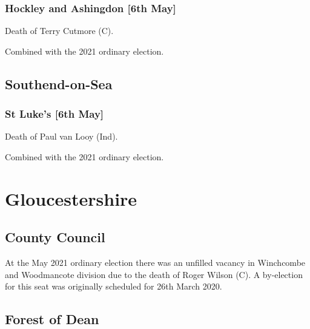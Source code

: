 \documentclass[a4paper,openany]{book}
\begin{document}
\begin{resultsiii}
\subsubsection*{Hockley and Ashingdon \hspace*{\fill}\nolinebreak[1]%
	\enspace\hspace*{\fill}
	[6th May]}


Death of Terry Cutmore (C).

Combined with the 2021 ordinary election.

\subsection*{Southend-on-Sea}

\subsubsection*{St Luke's \hspace*{\fill}\nolinebreak[1]%
	\enspace\hspace*{\fill}
	[6th May]}


Death of Paul van Looy (Ind).

Combined with the 2021 ordinary election.

\section{Gloucestershire}

\subsection*{County Council}

At the May 2021 ordinary election there was an unfilled vacancy in Winchcombe and Woodmancote division due to the death of Roger Wilson (C).  A by-election for this seat was originally scheduled for 26th March 2020.

\subsection*{Forest of Dean}


\end{resultsiii}
\end{document}
